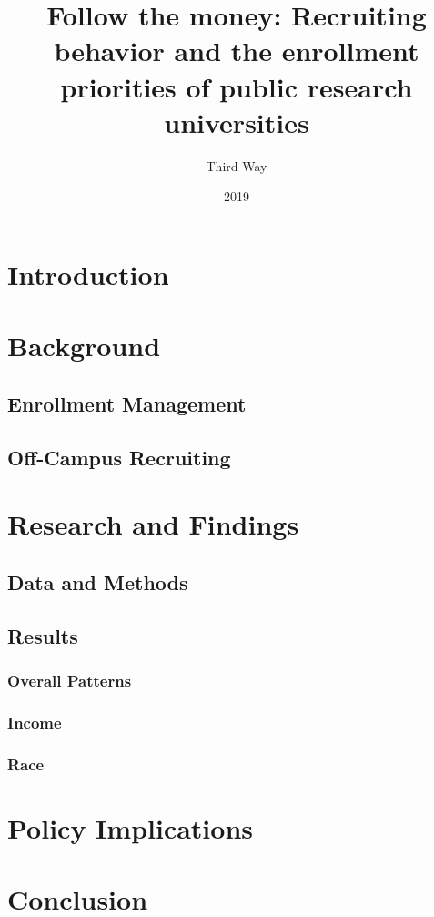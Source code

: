 \documentclass{article}
\title{Follow the money: Recruiting behavior and the enrollment priorities of public research universities}
\date{2019}
\author{Third Way}
\begin{document}


\maketitle

\newpage

\section*{Introduction}

\section*{Background}
\subsection*{Enrollment Management}
\subsection*{Off-Campus Recruiting}

\section*{Research and Findings}
\subsection*{Data and Methods}
\subsection*{Results}
\subsubsection*{Overall Patterns}
\subsubsection*{Income}
\subsubsection*{Race}

\section*{Policy Implications}

\section*{Conclusion}
\end{document}

